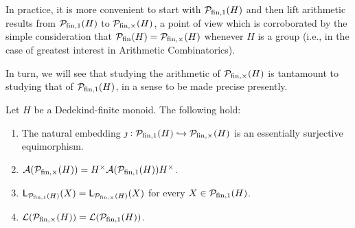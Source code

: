 In practice, it is more convenient to start with $\mathcal{P}_{\textrm{fin}, 1}(H)$ and then lift arithmetic results from $\mathcal{P}_{\textrm{fin}, 1}(H)$ to $\mathcal{P}_{\textrm{fin}, \times}(H)$, a point of view which is corroborated by the simple consideration that $\mathcal{P}_{\textrm{fin}}(H) = \mathcal{P}_{\textrm{fin}, \times}(H)$ whenever $H$ is a group (i.e., in the case of greatest interest in Arithmetic Combinatorics).

In turn, we will see that studying the arithmetic of $\mathcal{P}_{\textrm{fin}, \times}(H)$ is tantamount to studying that of $\mathcal{P}_{\textrm{fin}, 1}(H)$, in a sense to be made precise presently.

\begin{prop}\label{prop:funt&fun-have-the-same-system-of-lengths}
	Let $H$ be a Dedekind-finite monoid. The following hold:
	\begin{enumerate}[label={\rm (\roman{*})}]
	\item\label{it:prop:funt&fun-have-the-same-system-of-lengths(i)} The natural embedding $\jmath: \mathcal{P}_{\textrm{fin}, 1}(H)\hookrightarrow \mathcal{P}_{\textrm{fin}, \times}(H)$ is an essentially surjective equimorphism.
	\item\label{it:prop:funt&fun-have-the-same-system-of-lengths(ii)} $\mathcal{A}(\mathcal P_{{\textrm{fin}, \times}}(H)) = H^\times \mathcal{A}(\mathcal P_{{\textrm{fin}, 1}}(H)) H^\times$.
	\item\label{it:prop:funt&fun-have-the-same-system-of-lengths(iii)} $\mathsf{L}_{\mathcal P_{{\textrm{fin}, 1}}(H)}(X) = \mathsf{L}_{\mathcal P_{{\textrm{fin}, \times}}(H)}(X)$ for every $X \in \mathcal P_{{\textrm{fin}, 1}}(H)$.
	\item\label{it:prop:funt&fun-have-the-same-system-of-lengths(iv)} $\mathcal{L}(\mathcal P_{{\textrm{fin}, \times}}(H)) = \mathcal{L}(\mathcal P_{{\textrm{fin}, 1}}(H))$.
	\end{enumerate}
\end{prop}
%
